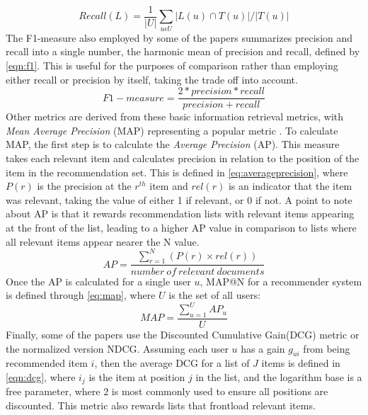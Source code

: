 \begin{equation}
    \label{eqn:recall}
    Recall(L) = \frac{1}{|U|} \sum\limits_{u \epsilon U} |L(u) \cap T(u)| / |T(u)|
\end{equation}
The F1-measure also employed by some of the papers summarizes precision and recall into a single number, the harmonic mean of precision and recall, defined by \autoref{eqn:f1}.
This is useful for the purposes of comparison rather than employing either recall or precision by itself, taking the trade off into account.
\begin{equation}
    \label{eqn:f1}
    F1-measure = \frac{2*precision*recall}{precision+recall}
\end{equation}
Other metrics are derived from these basic information retrieval metrics, with \textit{Mean Average Precision} (MAP) representing a popular metric \cite{ChoosingMetricsEvaluation}.
To calculate MAP, the first step is to calculate the \textit{Average Precision} (AP).
This measure takes each relevant item and calculates precision in relation to the position of the item in the recommendation set.
This is defined in \autoref{eq:averageprecision}, where $P(r)$ is the precision at the $r^{th}$ item and $rel(r)$ is an indicator that the item was relevant, taking the value of either 1 if relevant, or 0 if not.
A point to note about AP is that it rewards recommendation lists with relevant items appearing at the front of the list, leading to a higher AP value in comparison to lists where all relevant items appear nearer the N value. 
\begin{equation}
    \label{eq:averageprecision}
    AP = \frac{\sum\limits_{r=1}^N (P(r) \times rel(r))}{number \: of \: relevant \: documents}
\end{equation}
Once the AP is calculated for a single user $u$, MAP@N for a recommender system is defined through \autoref{eq:map}, where $U$ is the set of all users: 
\begin{equation}
    \label{eq:map}
    MAP = \frac{\sum\limits_{u=1}^U AP_u}{U}
\end{equation}
Finally, some of the papers use the Discounted Cumulative Gain(DCG) metric or the normalized version NDCG.
Assuming each user $u$ has a gain $g_{ui}$ from being recommended item $i$, then the average DCG for a list of $J$ items is defined in \autoref{eqn:dcg}, where $i_j$ is the item at position $j$ in the list, and the logarithm base is a free parameter, where $2$ is most commonly used to ensure all positions are discounted.
This metric also rewards lists that frontload relevant items.
